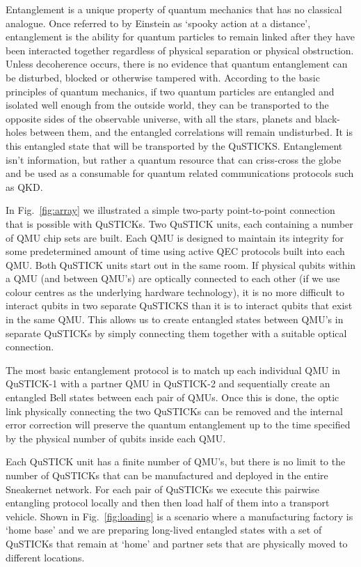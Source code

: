 \documentclass[twocolumn, aps, rmp, amsmath, amssymb, nofootinbib, superscriptaddress, longbibliography, floatfix, table-of-contents, eqsecnum]{revtex4-2}
\begin{document}
Entanglement is a unique property of quantum mechanics that has no classical analogue. Once referred to by Einstein as `spooky action at a distance', entanglement is the ability for quantum particles to remain linked after they have been interacted together regardless of physical separation or physical obstruction. Unless decoherence occurs, there is no evidence that quantum entanglement can be disturbed, blocked or otherwise tampered with. According to the basic principles of quantum mechanics, if two quantum particles are entangled and isolated well enough from the outside world, they can be transported to the opposite sides of the observable universe, with all the stars, planets and black-holes between them, and the entangled correlations will remain undisturbed. It is this entangled state that will be transported by the QuSTICKS. Entanglement isn't information, but rather a quantum resource that can criss-cross the globe and be used as a consumable for quantum related communications protocols such as QKD. 

In Fig.~\ref{fig:array} we illustrated a simple two-party point-to-point connection that is possible with QuSTICKs. Two QuSTICK units, each containing a number of QMU chip sets are built. Each QMU is designed to maintain its integrity for some predetermined amount of time using active QEC protocols built into each QMU. Both QuSTICK units start out in the same room. If physical qubits within a QMU (and between QMU's) are optically connected to each other (if we use colour centres as the underlying hardware technology), it is no more difficult to interact qubits in two separate QuSTICKS than it is to interact qubits that exist in the same QMU. This allows us to create entangled states between QMU's in separate QuSTICKs by simply connecting them together with a suitable optical connection. 

The most basic entanglement protocol is to match up each individual QMU in QuSTICK-1 with a partner QMU in QuSTICK-2 and sequentially create an entangled Bell states between each pair of QMUs. Once this is done, the optic link physically connecting the two QuSTICKs can be removed and the internal error correction will preserve the quantum entanglement up to the time specified by the physical number of qubits inside each QMU.

Each QuSTICK unit has a finite number of QMU's, but there is no limit to the number of QuSTICKs that can be manufactured and deployed in the entire Sneakernet network. For each pair of QuSTICKs we execute this pairwise entangling protocol locally and then then load half of them into a transport vehicle. Shown in Fig.~\ref{fig:loading} is a scenario where a manufacturing factory is `home base' and we are preparing long-lived entangled states with a set of QuSTICKs that remain at `home' and partner sets that are physically moved to different locations. 
\end{document}
